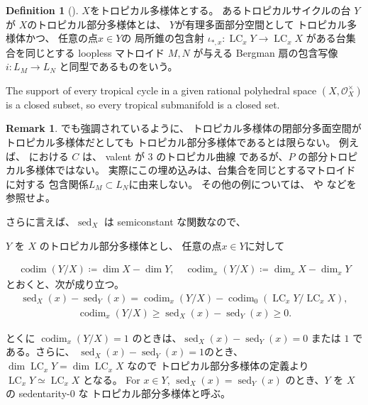 \documentclass[a4paper,dvipdfmx,reqno,12pt]{amsart}
\theoremstyle{definition}
\newtheorem{definition}[theorem]{Definition}
\newtheorem{remark}[theorem]{Remark}
\newcommand{\deq}{\coloneqq}
\newcommand{\opn}[1]{\operatorname{#1}}
\numberwithin{equation}{section}
\begin{document}
\begin{definition}[{\cite[Definition 2.14]{demedrano2023chern}}]
$X$をトロピカル多様体とする。
あるトロピカルサイクルの台 $Y$ が
$X$のトロピカル部分多様体とは、
$Y$が有理多面部分空間として
トロピカル多様体かつ、
任意の点$x\in Y$の
局所錐の包含射
$\iota_{*,x}\colon \opn{LC}_x Y\to 
\opn{LC}_x X$
がある台集合を同じとする loopless マトロイド
$M,N$ が与える Bergman 扇の包含写像
$i \colon L_M\to L_N$
と同型であるものをいう。
\end{definition}

The support of every tropical cycle in a given
rational polyhedral space $(X,\mathcal{O}_X^{\times})$ is
a closed subset, so every tropical submanifold is
a closed set.

\begin{remark}
\cite[Example 2.15]{demedrano2023chern}でも強調されているように、
トロピカル多様体の閉部分多面空間がトロピカル多様体だとしても
トロピカル部分多様体であるとは限らない。
例えば、
\cite[Example 2.21]{shaw2015tropical}
における $C$ は、 valent が $3$ のトロピカル曲線
であるが、$P$ の部分トロピカル多様体ではない。
実際にこの埋め込みは、台集合を同じとするマトロイドに対する
包含関係$L_M\subset L_N$に由来しない。
その他の例については、
\cite{MR2594592} や \cite{MR3339531}
などを参照せよ。


\end{remark}


さらに言えば、$\opn{sed}_X$ は
semiconstant な関数なので、




$Y$ を $X$ 
のトロピカル部分多様体とし、
任意の点$x\in Y$に対して

\begin{align}
\opn{codim}(Y/X)\deq \dim X -\dim Y,\quad 
\opn{codim}_x(Y/X)\deq \dim_x X -\dim_x Y
\end{align}
とおくと、次が成り立つ。
\begin{align}
\opn{sed}_X(x)-\opn{sed}_Y(x)=
\opn{codim}_x(Y/X)-\opn{codim}_0(\opn{LC}_x Y/\opn{LC}_xX),
\end{align}
\begin{align}
\opn{codim}_x(Y/X) \geq 
\opn{sed}_X(x)-\opn{sed}_Y(x)\geq 0.
\end{align}

とくに $\opn{codim}_x(Y/X)=1$
のときは、$\opn{sed}_X(x)-\opn{sed}_Y(x)=0$ または
$1$ である。さらに、
$\opn{sed}_X(x)-\opn{sed}_Y(x)=1$のとき、
$\dim \opn{LC}_x Y=\dim \opn{LC}_x X$
なので トロピカル部分多様体の定義より
$\opn{LC}_x Y\simeq \opn{LC}_x X$
となる。
For $x\in Y$,
$\opn{sed}_X(x)=\opn{sed}_Y(x)$ 
のとき、$Y$ を $X$ の sedentarity-0 な
トロピカル部分多様体と呼ぶ。 
\end{document}
